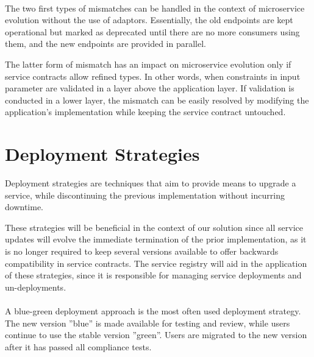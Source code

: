 \paragraph{}

The two first types of mismatches can be handled in the context of microservice evolution without the use of adaptors.
Essentially, the old endpoints are kept operational but marked as deprecated until there are no more consumers using them, and the new endpoints are provided in parallel.

The latter form of mismatch has an impact on microservice evolution only if service contracts allow refined types.
In other words, when constraints in input parameter are validated in a layer above the application layer.
If validation is conducted in a lower layer, the mismatch can be easily resolved by modifying the application's implementation while keeping the service contract untouched.

\section{Deployment Strategies} %
\label{sec:deployment_strategies}

Deployment strategies are techniques that aim to provide means to upgrade a service,
while discontinuing the previous implementation without incurring downtime.

These strategies will be beneficial in the context of our solution since all service updates will evolve the immediate termination of the prior implementation,
as it is no longer required to keep several versions available to offer backwards compatibility in service contracts.
The service registry will aid in the application of these strategies, since it is responsible for managing service deployments and un-deployments.

\paragraph{}

A blue-green deployment approach is the most often used deployment strategy.
The new version ''blue'' is made available for testing and review, while users continue to use the stable version ''green''.
Users are migrated to the new version after it has passed all compliance tests.

\paragraph{}

